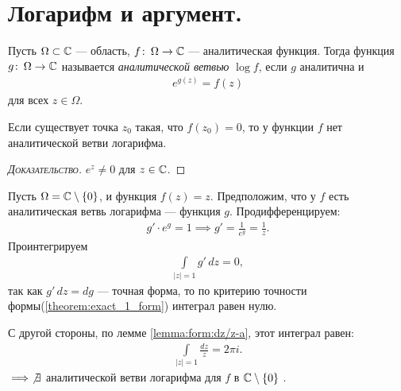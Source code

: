 \documentclass[../complex-analysis.tex]{subfiles}
\begin{document}
\section{Логарифм и аргумент.}

\begin{df}
 Пусть $ \Omega  \subset \mathbb{C}$ --- область, $ f \colon\, \Omega \to \mathbb{C}   $ --- аналитическая функция. Тогда функция $ g \colon\, \Omega \to \mathbb{C}   $ называется \textit{аналитической ветвью} $ \log f $, если $ g $ аналитична и
 \begin{align*}
  e^{g(z)} = f(z)
 \end{align*} для всех $ z \in \Omega $.
\end{df}
\begin{remrk}
 Если существует точка $ z_0 $ такая, что $ f(z_0) = 0 $, то у функции $ f $ нет аналитической ветви логарифма. 
\end{remrk}
\begin{proof}[\normalfont\textsc{Доказательство}]
 $ e^{z} \neq 0 $ для $ z \in \mathbb{C} $.
\end{proof}

\begin{exmpl}
 Пусть $ \Omega = \mathbb{C} \setminus \left\{ 0 \right\} $, и функция $ f(z) = z $. Предположим, что у $ f $ есть аналитическая ветвь логарифма --- функция $ g $. Продифференцируем:
 \begin{align*}
  g' \cdot e^{g} = 1 \implies g' = \frac{1}{e^{g}} = \frac{1}{z}.
 \end{align*} Проинтегрируем
 \begin{align*}
  \int\limits_{\left| z \right|=1} g'\,dz = 0,
\end{align*} так как $ g'\,dz = dg $ --- точная форма, то по критерию точности формы(\ref{theorem:exact_1_form}) интеграл равен нулю.

 С другой стороны, по лемме \ref{lemma:form:dz/z-a}, этот интеграл равен:
 \begin{align*}
  \int\limits_{\left| z \right|=1}   \frac{dz}{z} = 2\pi i.
\end{align*} $\implies \not \exists$ аналитической ветви логарифма для $f$ в $\mathbb{C} \setminus \left\{ 0 \right\} $ .   
\end{exmpl}
\end{document}
